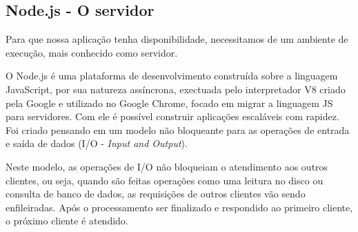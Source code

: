 \documentclass[
    article,            %
    11pt,               %
    oneside,            %
    a4paper,            %
    english,            %
    brazil,             %
    sumario=tradicional
    ]{abntex2}
\begin{document}
\subsection{Node.js - O servidor}

Para que nossa aplicação tenha disponibilidade, necessitamos de um ambiente de execução, mais conhecido como servidor.

O Node.js é uma plataforma de desenvolvimento construída sobre a linguagem JavaScript, por sua natureza assíncrona, exectuada pelo interpretador V8 criado pela Google e utilizado no Google Chrome, focado em migrar a linguagem JS para servidores. Com ele é possível construir aplicações escaláveis com rapidez. Foi criado pensando em um modelo não bloqueante para as operações de entrada e saída de dados (I/O - \textit{Input and Output}).

Neste modelo, as operações de I/O não bloqueiam o atendimento aos outros clientes, ou seja, quando são feitas operações como uma leitura no disco ou consulta de banco de dados, as requisições de outros clientes vão sendo enfileiradas. Após o processamento ser finalizado e respondido ao primeiro cliente, o próximo cliente é atendido.
\end{document}
